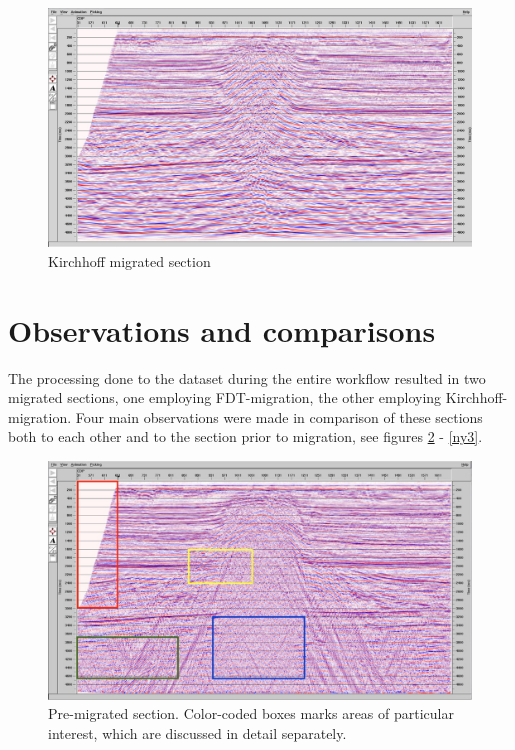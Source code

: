 \documentclass[10pt,a4paper]{article}
\begin{document}
\begin{figure}[H]
\includegraphics[width=\textwidth]{kirchhmed3aforkirchh.jpg}
\caption{Kirchhoff migrated section}
\label{KTM}
\end{figure}

\section{Observations and comparisons}

The processing done to the dataset during the entire workflow resulted in two migrated sections, one employing FDT-migration, the other employing Kirchhoff-migration. Four main observations were made in comparison of these sections both to each other and to the section prior to migration, see figures \ref{ny1} - \ref{ny3}. 

\begin{figure}[H]
\includegraphics[width=\textwidth]{ny1.jpg}
\caption{Pre-migrated section. Color-coded boxes marks areas of particular interest, which are discussed in detail separately.}
\label{ny1}
\end{figure}
\end{document}
